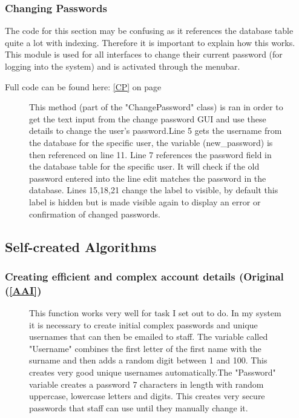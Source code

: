 \begin{landscape}
\subsubsection{Changing Passwords}

The code for this section may be confusing as it references the database table quite a lot with indexing. Therefore it is important to explain how this works. This module is used for all interfaces to change their current password (for logging into the system) and is activated through the menubar.

Full code can be found here: \ref{CP} on page \pageref{CP}

\begin{figure}[H]
    \caption{This method (part of the "ChangePassword" class) is ran in order to get the text input from the change password GUI and use these details to change the user's password.\newline Line 5 gets the username from the database for the specific user, the variable (new\_password) is then referenced on line 11. \newline Line 7 references the password field in the database table for the specific user. It will check if the old password entered into the line edit matches the password in the database. \newline Lines 15,18,21 change the label to visible, by default this label is hidden but is made visible again to display an error or confirmation of changed passwords.}  
\end{figure}


\subsection{Self-created Algorithms}

\subsubsection{Creating efficient and complex account details (Original (\ref{AAI})}

\begin{figure}[H]
    \caption{This function works very well for task I set out to do. In my system it is necessary to create initial complex passwords and unique usernames that can then be emailed to staff. \newline The variable called "Username" combines the first letter of the first name with the surname and then adds a random digit between 1 and 100. This creates very good unique usernames automatically.\newline The "Password" variable creates a password 7 characters in length with random uppercase, lowercase letters and digits. This creates very secure passwords that staff can use until they manually change it.}  
\end{figure}



\end{landscape}
